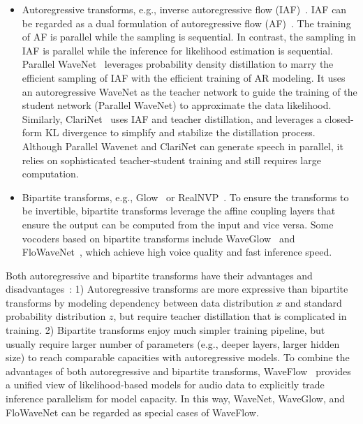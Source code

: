 \documentclass{article}
\begin{document}
\begin{itemize}[leftmargin=*]
\item Autoregressive transforms, e.g., inverse autoregressive flow (IAF)~\cite{kingma2016improved}. IAF can be regarded as a dual formulation of autoregressive flow (AF)~\cite{papamakarios2017masked,huang2018neural}. The training of AF is parallel while the sampling is sequential. In contrast, the sampling in IAF is parallel while the inference for likelihood estimation is sequential. Parallel WaveNet~\cite{oord2018parallel} leverages probability density distillation to marry the efficient sampling of IAF with the efficient training of AR modeling. It uses an autoregressive WaveNet as the teacher network to guide the training of the student network (Parallel WaveNet) to approximate the data likelihood. Similarly, ClariNet~\cite{ping2018clarinet} uses IAF and teacher distillation, and leverages a closed-form KL divergence to simplify and stabilize the distillation process. Although Parallel Wavenet and ClariNet can generate speech in parallel, it relies on sophisticated teacher-student training and still requires large computation.

\item Bipartite transforms, e.g., Glow~\cite{kingma2018glow} or RealNVP~\cite{dinh2016density}. To ensure the transforms to be invertible, bipartite transforms leverage the affine coupling layers that ensure the output can be computed from the input and vice versa. Some vocoders based on bipartite transforms include WaveGlow~\cite{prenger2019waveglow} and FloWaveNet~\cite{kim2019flowavenet}, which achieve high voice quality and fast inference speed. 
\end{itemize}

Both autoregressive and bipartite transforms have their advantages and disadvantages~\cite{ping2020waveflow}: 1) Autoregressive transforms are more expressive than bipartite transforms by modeling dependency between data distribution $x$ and standard probability distribution $z$, but require teacher distillation that is complicated in training. 2) Bipartite transforms enjoy much simpler training pipeline, but usually require larger number of parameters (e.g., deeper layers, larger hidden size) to reach comparable capacities with autoregressive models. To combine the advantages of both autoregressive and bipartite transforms, WaveFlow~\cite{ping2020waveflow} provides a unified view of likelihood-based models for audio data to explicitly trade inference parallelism for model capacity. In this way, WaveNet, WaveGlow, and FloWaveNet can be regarded as special cases of WaveFlow. 
\end{document}
